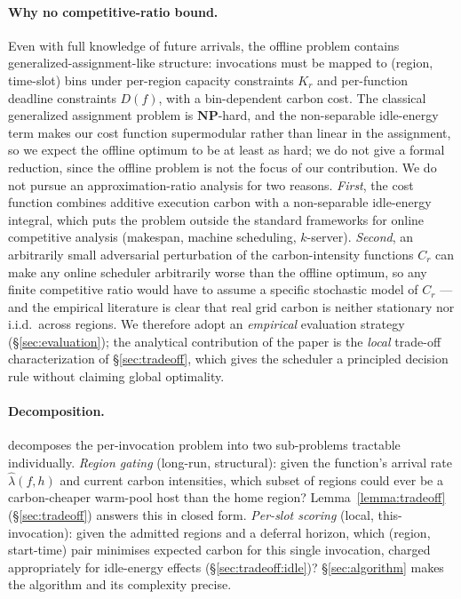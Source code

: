\paragraph{Why no competitive-ratio bound.} Even with full knowledge
of future arrivals, the offline problem contains
generalized-assignment-like structure: invocations must be mapped to
(region, time-slot) bins under per-region capacity constraints $K_r$
and per-function deadline constraints $D(f)$, with a bin-dependent
carbon cost. The classical generalized assignment problem is
$\mathbf{NP}$-hard, and the non-separable idle-energy term makes our
cost function supermodular rather than linear in the assignment, so
we expect the offline optimum to be at least as hard; we do not give
a formal reduction, since the offline problem is not the focus of our
contribution. We do not pursue an approximation-ratio analysis for
two reasons. \emph{First}, the cost function combines additive
execution carbon with a non-separable idle-energy integral, which
puts the problem outside the standard frameworks for online
competitive analysis (makespan, machine scheduling, $k$-server).
\emph{Second}, an arbitrarily small adversarial perturbation of the
carbon-intensity functions $C_r$ can make any online scheduler
arbitrarily worse than the offline optimum, so any finite competitive
ratio would have to assume a specific stochastic model of $C_r$ ---
and the empirical literature is clear that real grid carbon is
neither stationary nor i.i.d.\ across regions. We therefore adopt an
\emph{empirical} evaluation strategy (\S\ref{sec:evaluation}); the
analytical contribution of the paper is the \emph{local} trade-off
characterization of \S\ref{sec:tradeoff}, which gives the scheduler a
principled decision rule without claiming global optimality.

\paragraph{Decomposition.} \GreenFaaS{} decomposes the per-invocation
problem into two sub-problems tractable individually. \emph{Region
gating} (long-run, structural): given the function's arrival rate
$\hat\lambda(f, h)$ and current carbon intensities, which subset of
regions could ever be a carbon-cheaper warm-pool host than the home
region? Lemma~\ref{lemma:tradeoff} (\S\ref{sec:tradeoff}) answers
this in closed form. \emph{Per-slot scoring} (local, this-invocation):
given the admitted regions and a deferral horizon, which
(region, start-time) pair minimises expected carbon for this single
invocation, charged appropriately for idle-energy effects
(\S\ref{sec:tradeoff:idle})? \S\ref{sec:algorithm} makes the
algorithm and its complexity precise.

